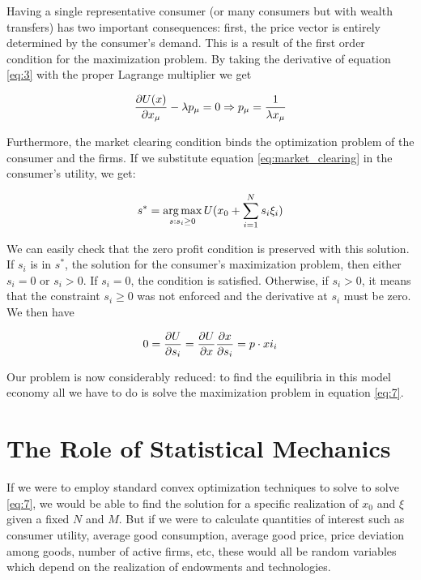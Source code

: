 Having a single representative consumer (or
many consumers but with wealth transfers) has two important
consequences: first, the price vector is entirely determined by the
consumer's demand. This is a result of the first order condition for
the maximization problem. By taking the derivative of equation
\eqref{eq:3} with the proper Lagrange multiplier we get

\begin{equation}
  \label{eq:8}
  \frac{\partial U(x)}{\partial x_\mu} - \lambda p_\mu = 0 \Rightarrow p_\mu =
  \frac{1}{\lambda x_\mu}
\end{equation}

Furthermore, the market clearing condition binds the optimization
problem of the consumer and the firms. If we substitute equation
\eqref{eq:market_clearing} in the consumer's utility, we get:

\begin{equation}
  \label{eq:7}
  s^\ast = \operatorname*{arg\,max}_{s : s_i \geq 0} U(x_0 + \sum_{i=1}^N s_i \xi_i)
\end{equation}

We can easily check that the zero profit condition is preserved with
this solution. If $s_i$ is in $s^\ast$, the solution for the
consumer's maximization problem, then either $s_i = 0$ or $s_i >
0$. If $s_i = 0$, the condition is satisfied. Otherwise, if $s_i > 0$,
it means that the constraint $s_i \geq 0$ was not enforced and the
derivative at $s_i$ must be zero. We then have

\begin{equation}
  \label{eq:9}
  0 = \frac{\partial U}{\partial s_i} = \frac{\partial U}{\partial x} \frac{\partial
    x}{\partial s_i} = p\cdot xi_i
\end{equation}

Our problem is now considerably reduced: to find the equilibria in
this model economy all we have to do is solve the maximization problem
in equation \eqref{eq:7}.


\section{The Role of Statistical Mechanics} \label{sec:rle_statmech}

If we were to employ standard convex optimization techniques to solve
to solve \eqref{eq:7}, we would be able to find the solution for a
specific realization of $x_0$ and $\xi$ given a fixed $N$ and $M$. But
if we were to calculate quantities of interest such as consumer
utility, average good consumption, average good price, price deviation
among goods, number of active firms, etc, these would all be random
variables which depend on the realization of endowments and
technologies.

